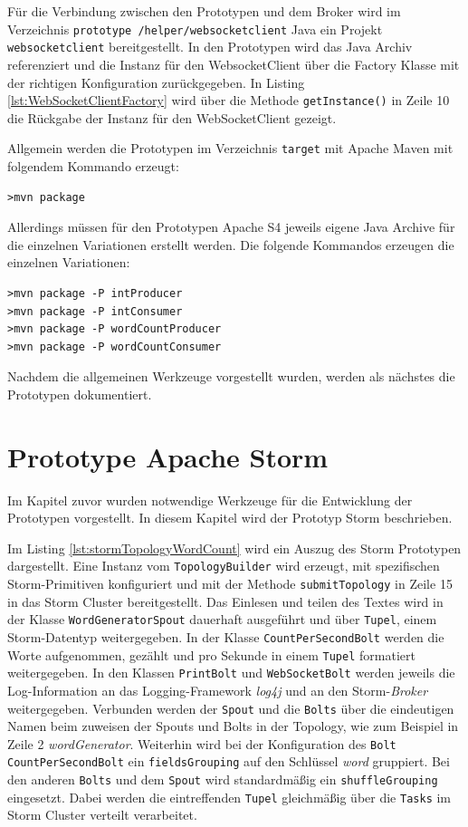 Für die Verbindung zwischen den Prototypen und dem Broker wird im Verzeichnis \texttt{prototype /helper/websocketclient} Java ein Projekt \texttt{websocketclient} bereitgestellt. In den Prototypen wird das Java Archiv referenziert und 
die Instanz für den WebsocketClient über die Factory Klasse mit der richtigen Konfiguration zurückgegeben. In Listing \ref{lst:WebSocketClientFactory} wird über die Methode \texttt{getInstance()} in Zeile 10 die Rückgabe der Instanz für den WebSocketClient gezeigt.

Allgemein werden die Prototypen im Verzeichnis \texttt{target} mit Apache Maven mit folgendem Kommando erzeugt:
\begin{verbatim}
>mvn package
\end{verbatim}

Allerdings müssen für den Prototypen Apache S4 jeweils eigene Java Archive für die einzelnen Variationen erstellt werden. Die folgende Kommandos erzeugen die einzelnen Variationen:
\begin{verbatim}
>mvn package -P intProducer
>mvn package -P intConsumer
>mvn package -P wordCountProducer
>mvn package -P wordCountConsumer
\end{verbatim}

Nachdem die allgemeinen Werkzeuge vorgestellt wurden, werden als nächstes die Prototypen dokumentiert.


\section{Prototype Apache Storm}
\label{sec:prot:storm}

Im Kapitel zuvor wurden notwendige Werkzeuge für die Entwicklung der Prototypen vorgestellt. In diesem Kapitel wird der Prototyp Storm beschrieben. 

Im Listing \ref{lst:stormTopologyWordCount} wird ein Auszug des Storm Prototypen dargestellt. Eine Instanz vom \texttt{TopologyBuilder} wird erzeugt, mit spezifischen Storm-Primitiven konfiguriert und mit der Methode \texttt{submitTopology} in Zeile 15 in das Storm Cluster bereitgestellt. Das Einlesen und teilen des Textes wird in der Klasse \texttt{WordGeneratorSpout} dauerhaft ausgeführt und über \texttt{Tupel}, einem Storm-Datentyp weitergegeben. In der Klasse \texttt{CountPerSecondBolt} werden die Worte aufgenommen, gezählt und pro Sekunde in einem \texttt{Tupel} formatiert weitergegeben. In den Klassen \texttt{PrintBolt} und \texttt{WebSocketBolt} werden jeweils die Log-Information an das Logging-Framework \textit{log4j} und an den Storm-\textit{Broker} weitergegeben. Verbunden werden der \texttt{Spout} und die \texttt{Bolts} über die eindeutigen Namen beim zuweisen der Spouts und Bolts in der Topology, wie zum Beispiel in Zeile 2 \textit{wordGenerator}. Weiterhin wird bei der Konfiguration des \texttt{Bolt} \texttt{CountPerSecondBolt} ein \texttt{fieldsGrouping} auf den Schlüssel \textit{word} gruppiert. Bei den anderen \texttt{Bolts} und dem \texttt{Spout} wird standardmäßig ein \texttt{shuffleGrouping} eingesetzt. Dabei werden die eintreffenden \texttt{Tupel} gleichmäßig über die \texttt{Tasks} im Storm Cluster verteilt verarbeitet.

